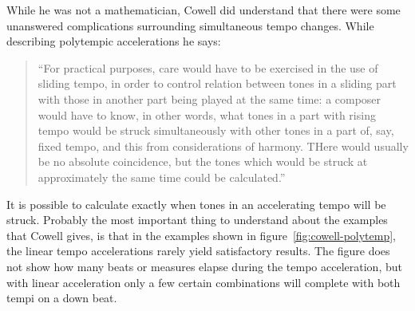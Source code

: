 While he was not a mathematician, Cowell did understand that there
were some unanswered complications surrounding simultaneous tempo
changes. While describing polytempic accelerations he says:
\begin{quotation}
``For practical purposes, care would have to be exercised in the use of
sliding tempo, in order to control relation between tones in a sliding
part with those in another part being played at the same time: a
composer would have to know, in other words, what tones in a part with
rising tempo would be struck simultaneously with other tones in a part
of, say, fixed tempo, and this from considerations of harmony. THere
would usually be no absolute coincidence, but the tones which would be
struck at approximately the same time could be calculated.''
\end{quotation}
It is possible to calculate exactly when tones in an accelerating
tempo will be struck. Probably the most important thing to understand
about the examples that Cowell gives, is that in the examples shown in
figure~\ref{fig:cowell-polytemp}, the linear tempo accelerations
rarely yield satisfactory results. The figure does not show how many
beats or measures elapse during the tempo acceleration, but with
linear acceleration only a few certain combinations will complete with
both tempi on a down beat.

